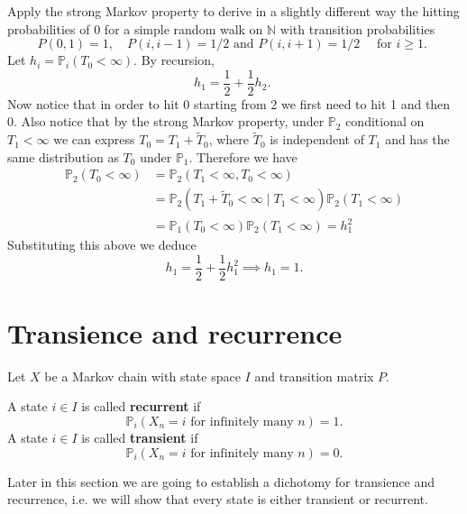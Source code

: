 \documentclass[a4paper,11pt]{article}
\begin{document}
\begin{example}
    Apply the strong Markov property to derive in a slightly different way the hitting probabilities of 0 for a simple random walk on $\mathbb{N}$ with transition probabilities
    \[
    P(0,1)=1,\quad P(i, i-1)=1 / 2 \text { and } P(i, i+1)=1 / 2\quad \text { for } i \geq 1 \text {. }
    \]
    Let $h_i=\mathbb{P}_i\left(T_0<\infty\right)$. By recursion, 
    \[
    h_1=\frac{1}{2}+\frac{1}{2} h_2 \text {. }
    \]
    Now notice that in order to hit 0 starting from 2 we first need to hit 1 and then 0. Also notice that by the strong Markov property, under $\mathbb{P}_2$ conditional on $T_1<\infty$ we can express $T_0=T_1+\tilde{T}_0$, where $\tilde{T}_0$ is independent of $T_1$ and has the same distribution as $T_0$ under $\mathbb{P}_1$. Therefore we have
    \begin{align*}
        \mathbb{P}_2\left(T_0<\infty\right)&=\mathbb{P}_2\left(T_1<\infty, T_0<\infty\right)\\ 
        &=\mathbb{P}_2\left(T_1+\tilde{T}_0<\infty \mid T_1<\infty\right) \mathbb{P}_2\left(T_1<\infty\right) \\
        &=\mathbb{P}_1\left(T_0<\infty\right) \mathbb{P}_2\left(T_1<\infty\right)=h_1^2
    \end{align*}
    Substituting this above we deduce
    \[
    h_1=\frac{1}{2}+\frac{1}{2} h_1^2 \implies h_1=1 .
    \]
\end{example}

\section{Transience and recurrence}
Let $X$ be a Markov chain with state space $I$ and transition matrix $P$.
\begin{definition}
    A state $i \in I$ is called \textbf{recurrent} if
    \[
    \mathbb{P}_i\left(X_n=i \text { for infinitely many } n\right)=1 .
    \]
    A state $i \in I$ is called \textbf{transient} if
    \[
    \mathbb{P}_i\left(X_n=i \text { for infinitely many } n\right)=0 .
    \]
\end{definition}
Later in this section we are going to establish a dichotomy for transience and recurrence, i.e. we will show that every state is either transient or recurrent.
\end{document}
